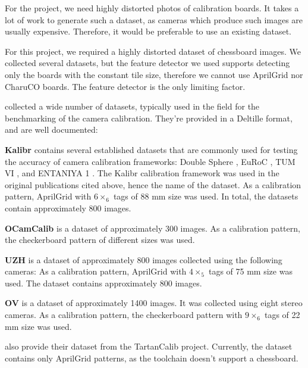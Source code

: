 For the project, we need highly distorted photos of calibration boards. It takes
a lot of work to generate such a dataset, as cameras which produce such images are
usually expensive. Therefore, it would be preferable to use an existing dataset.

For this project, we required a highly distorted dataset of chessboard images.
We collected several datasets, but the feature detector we used supports
detecting only the boards with the constant tile size, therefore we cannot use
AprilGrid nor CharuCO boards. The feature detector is the only limiting factor.

\textcite{lochmanBabelCalibUniversalApproach2021} collected a wide number of
datasets, typically used in the field for the benchmarking of the camera
calibration. They're provided in a Deltille \cite{DeltilleDetector2023} format,
and are well documented:

\textbf{Kalibr} \citep{mayeSelfsupervisedCalibrationRobotic2013} contains several established datasets that are commonly used for testing
the accuracy of camera calibration frameworks: Double Sphere
\cite{usenkoDoubleSphereCamera2018}, EuRoC \cite{burriEuRoCMicroAerial2016}, TUM
VI \cite{schubertTUMVIBenchmark2018}, and ENTANIYA 1
\cite{Calibration250degFisheye}.
The Kalibr calibration framework was used in the
original publications cited above, hence the name of the dataset.
As a calibration pattern, AprilGrid with  \(6\times_6\) tags of 88 mm size was used.
In total, the datasets contain approximately 800 images.

\textbf{OCamCalib} \citep{scaramuzzaFlexibleTechniqueAccurate2006} is a dataset
of approximately 300 images.
As a calibration pattern, the checkerboard pattern of different sizes was used.

\textbf{UZH} \citep{AreWeReady} is a dataset of approximately 800 images
collected using the following cameras:
As a calibration pattern, AprilGrid with \(4\times_5\) tags of 75 mm size was used.
The dataset contains approximately 800 images.

\textbf{OV} \citep{lochmanBabelCalibUniversalApproach2021} is a dataset of
approximately 1400 images. It was collected using eight stereo cameras.
As a calibration pattern, the checkerboard pattern with \(9\times_6\) tags of 22 mm size
was used.

\textcite{duisterhofTartanCalibIterativeWideAngle2022} also provide their
dataset from the TartanCalib project. Currently, the dataset contains only
AprilGrid patterns, as the toolchain doesn't support a chessboard.

